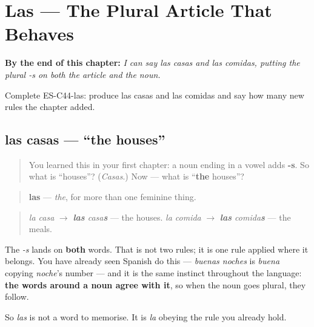 
\chapter{Las --- The Plural Article That Behaves}
\label{ch:articles-las}

\begin{chapteropening}
\textbf{By the end of this chapter:} \emph{I can say las casas and las comidas, putting the plural -s on both the article and the noun.}

Complete ES-C44-las: produce las casas and las comidas and say how many new rules the chapter added.
\end{chapteropening}

\section[las casas]{las casas — \textquotedblleft{}the houses\textquotedblright{}}

\label{lesson:ES-C44-las}



\begin{quote}
You learned this in your first chapter: a noun ending in a vowel adds \textbf{-s}. So what is \textquotedblleft{}houses\textquotedblright{}? (\emph{Casas}.) Now — what is \textquotedblleft{}\textbf{the} houses\textquotedblright{}?
\end{quote}

\begin{grammarlens}[title={Grammar Lens: the article does what the noun does}]
\begin{quote}
\textbf{las} — \emph{the}, for more than one feminine thing.
\end{quote}

\begin{quote}
\emph{la casa} $\to$ \emph{\textbf{las} casa\textbf{s}} — the houses. \emph{la comida} $\to$ \emph{\textbf{las} comida\textbf{s}} — the meals.
\end{quote}

The \emph{-s} lands on \textbf{both} words. That is not two rules; it is one rule applied where it belongs. You have already seen Spanish do this — \emph{buenas noches} is \emph{buena} copying \emph{noche}'s number — and it is the same instinct throughout the language: \textbf{the words around a noun agree with it}, so when the noun goes plural, they follow.

So \emph{las} is not a word to memorise. It is \emph{la} obeying the rule you already hold.
\end{grammarlens}

